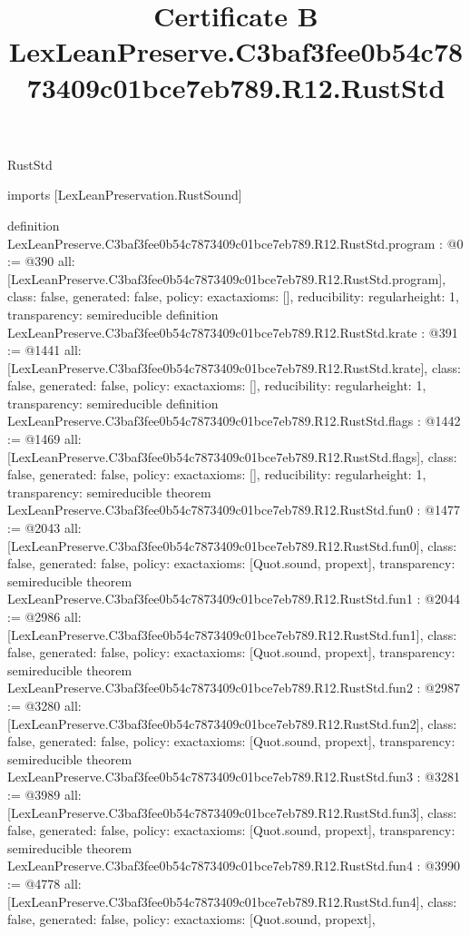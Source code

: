 \begin{lexlean}{RustStd}
\title{Certificate B LexLeanPreserve.C3baf3fee0b54c7873409c01bce7eb789.R12.RustStd}
\begin{coremodule}
imports [LexLeanPreservation.RustSound]

definition LexLeanPreserve.C3baf3fee0b54c7873409c01bce7eb789.R12.RustStd.program : @0 := @390 {
  all: [LexLeanPreserve.C3baf3fee0b54c7873409c01bce7eb789.R12.RustStd.program],
  class: false,
  generated: false,
  policy: exact{axioms: []},
  reducibility: regular{height: 1},
  transparency: semireducible
}
definition LexLeanPreserve.C3baf3fee0b54c7873409c01bce7eb789.R12.RustStd.krate : @391 := @1441 {
  all: [LexLeanPreserve.C3baf3fee0b54c7873409c01bce7eb789.R12.RustStd.krate],
  class: false,
  generated: false,
  policy: exact{axioms: []},
  reducibility: regular{height: 1},
  transparency: semireducible
}
definition LexLeanPreserve.C3baf3fee0b54c7873409c01bce7eb789.R12.RustStd.flags : @1442 := @1469 {
  all: [LexLeanPreserve.C3baf3fee0b54c7873409c01bce7eb789.R12.RustStd.flags],
  class: false,
  generated: false,
  policy: exact{axioms: []},
  reducibility: regular{height: 1},
  transparency: semireducible
}
theorem LexLeanPreserve.C3baf3fee0b54c7873409c01bce7eb789.R12.RustStd.fun0 : @1477 := @2043 {
  all: [LexLeanPreserve.C3baf3fee0b54c7873409c01bce7eb789.R12.RustStd.fun0],
  class: false,
  generated: false,
  policy: exact{axioms: [Quot.sound, propext]},
  transparency: semireducible
}
theorem LexLeanPreserve.C3baf3fee0b54c7873409c01bce7eb789.R12.RustStd.fun1 : @2044 := @2986 {
  all: [LexLeanPreserve.C3baf3fee0b54c7873409c01bce7eb789.R12.RustStd.fun1],
  class: false,
  generated: false,
  policy: exact{axioms: [Quot.sound, propext]},
  transparency: semireducible
}
theorem LexLeanPreserve.C3baf3fee0b54c7873409c01bce7eb789.R12.RustStd.fun2 : @2987 := @3280 {
  all: [LexLeanPreserve.C3baf3fee0b54c7873409c01bce7eb789.R12.RustStd.fun2],
  class: false,
  generated: false,
  policy: exact{axioms: [Quot.sound, propext]},
  transparency: semireducible
}
theorem LexLeanPreserve.C3baf3fee0b54c7873409c01bce7eb789.R12.RustStd.fun3 : @3281 := @3989 {
  all: [LexLeanPreserve.C3baf3fee0b54c7873409c01bce7eb789.R12.RustStd.fun3],
  class: false,
  generated: false,
  policy: exact{axioms: [Quot.sound, propext]},
  transparency: semireducible
}
theorem LexLeanPreserve.C3baf3fee0b54c7873409c01bce7eb789.R12.RustStd.fun4 : @3990 := @4778 {
  all: [LexLeanPreserve.C3baf3fee0b54c7873409c01bce7eb789.R12.RustStd.fun4],
  class: false,
  generated: false,
  policy: exact{axioms: [Quot.sound, propext]},
}
\end{coremodule}
\end{lexlean}
